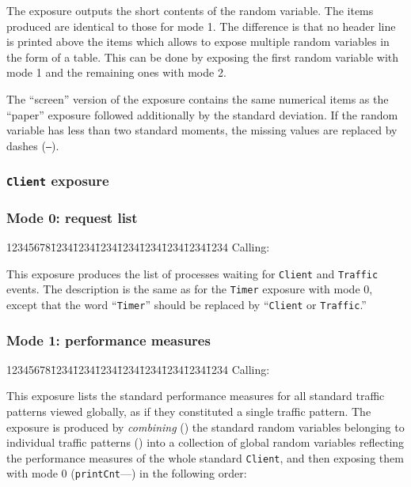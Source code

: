 The exposure outputs the short
contents of the random variable.
The items produced are identical to those for mode 1.
The difference is that no header line is printed above the items which
allows to expose multiple random variables in the form of a table.
This can be done by exposing the first random variable with mode 1 and
the remaining ones with mode 2.

The ``screen'' version of the exposure contains the same numerical items as the
``paper'' exposure followed additionally by the standard deviation.
If the random variable has less than two standard moments, the missing
values are replaced by dashes ({\tt ---}).

\subsubsection{{\tt Client} exposure}
\label{rm_ex_se_cl}

\subsubsection*{Mode 0: request list}

{\tt\begin{tabbing}
12345678\=1234\=1234\=1234\=1234\=1234\=1234\=1234\=1234\kill
{\rm Calling:}
\end{tabbing}}

This exposure produces
the list of processes waiting for {\tt Client} and {\tt Traffic} events.
The description is the same as for the {\tt Timer} exposure
with mode 0, except that the word ``{\tt Timer}'' should be replaced by
``{\tt Client} or {\tt Traffic}.''

\subsubsection*{Mode 1: performance measures}

{\tt\begin{tabbing}
12345678\=1234\=1234\=1234\=1234\=1234\=1234\=1234\=1234\kill
{\rm Calling:}
\end{tabbing}}

This exposure lists the standard performance measures for all standard
traffic patterns viewed globally, as if they constituted a single traffic
pattern.
The exposure is produced by {\em combining\/} () the
standard random variables belonging to individual traffic patterns
() into
a collection of global random variables reflecting the performance measures
of the whole standard {\tt Client}, and then exposing them with mode 0
({\tt printCnt}---) in the following order:

